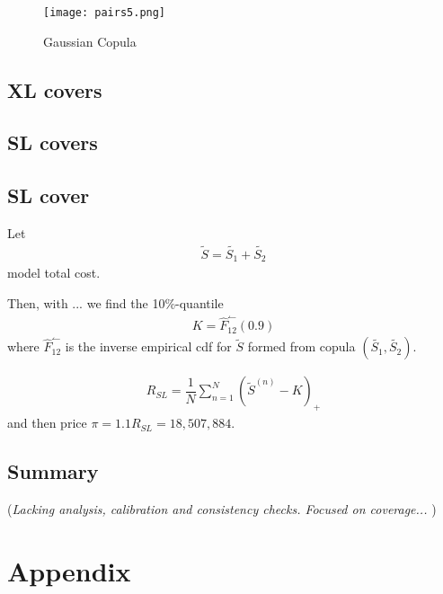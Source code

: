 \documentclass[11pt]{article}
\begin{document}
 \begin{figure}[H]
 \center
  \texttt{[image: pairs5.png]}
  \caption{Gaussian Copula}
  \label{fig:samplefig5}
\end{figure}

\subsection*{XL covers}

\subsection*{SL covers}

\subsection*{SL cover}
Let
\begin{align*} 
	\tilde{S}= \tilde{S_1} + \tilde{S_2}
\end{align*}
model total cost.

Then, with ... we find the 10\%-quantile
\begin{align*} 
	K = \hat{F}_{12}^\leftharpoonup(0.9)
\end{align*}
where $\hat{F}_{12}^\leftharpoonup$ is the inverse empirical cdf for $\tilde{S}$  formed from copula $(\tilde{S_1}, \tilde{S_2})$.

\begin{align} \label{eqsl1}
	R_{SL} = \dfrac{1}{N}\sum_{n=1}^N\left(	 \tilde{S}^{(n)}-K\right)_+        
\end{align}
and then price $\pi = 1.1R_{SL} = 18,507,884$.

\subsection*{Summary}
({\it Lacking analysis, calibration and consistency checks. Focused on coverage... })



\section*{Appendix}
\end{document}

